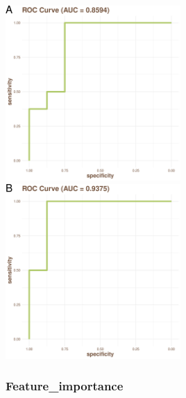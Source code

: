 \documentclass[
]{article}
\begin{document}
\includegraphics[width=0.5\textwidth,height=0.5\textheight]{../../Analysis_shotgun_PRJDB4176/03_ML/shotgun/atlas_binning/PRJDB4176_binning_best.model_draw_Roc_plot.png}
\includegraphics[width=0.5\textwidth,height=0.5\textheight]{../../Analysis_shotgun_PRJDB4176/03_ML/shotgun/krakens/PRJDB4176_best.model_draw_Roc_plot.png}

\hypertarget{feature_importance-1}{%
\subsubsection{Feature\_importance}\label{feature_importance-1}}
\end{document}
